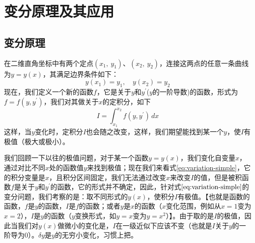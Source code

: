 \chapter{变分原理及其应用}

\section{变分原理}
在二维直角坐标中有两个定点$(x_1,\ y_1)$、$(x_2,\ y_2)$，连接这两点的任意一条曲线为$y = y(x)$，其满足边界条件如下：
\begin{equation}
    y(x_1) = y_1, \quad y(x_2) = y_2
\end{equation} 
现在，我们定义一个新的函数$f$，它是关于$y$和$y^{\prime}$($y$的一阶导数)的函数，形式为$f = f(y, y^{\prime})$，我们对其做关于$x$的定积分，如下
\begin{equation}
	I = \int_{x_1}^{x_2} f(y, y^{\prime}) \, dx	\label{eq:variation-simple}
\end{equation} 
这样，当$y$变化时，定积分$I$也会随之改变，这样，我们期望能找到某一个$y$，使$I$有极值（极大或极小）。

我们回顾一下以往的极值问题，对于某一个函数$y=y(x)$，我们变化自变量$x$，通过对比不同$x$处的函数值$y$来找到极值；现在我们来看式\eqref{eq:variation-simple}，它的积分变量是$x$，且积分区间固定，我们无法通过改变$x$来改变$I$的值，但是被积函数$f$是关于$y$和$y^{\prime}$的函数，它的形式并不确定，因此，针对式$\eqref{eq:variation-simple}$的变分问题，我们考察的是：取不同形式的$y(x)$，使积分$I$有极值。\CJKunderdot{\textcolor{red}{我们习惯上把$I$称作$y(x)$的泛函}}【也就是函数的函数，$f$是$y$的函数，$I$是$f$的函数；或者$y$是$x$的函数（$x$变化范围，例如从$x=1$变为$x=2$），$I$是$y$的函数（$y$变换形式，如$y=x$变为$y=x^2$）】。由于取的是$I$的极值，因此当我们对$y(x)$做微小的变化是，$I$在一级近似下应该不变（也就是$I$关于$y$的一阶导为0）。$\delta y$是$y$的无穷小变化，习惯上把\CJKunderdot{\textcolor{red}{$\delta y$称为$y$的变分}}。


